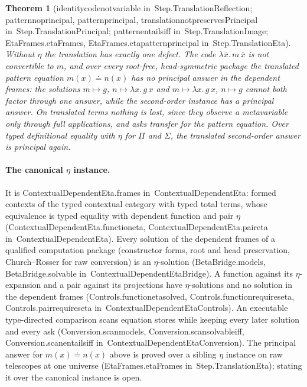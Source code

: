 \documentclass[11pt]{article}
\newtheorem{theorem}{Theorem}
\theoremstyle{remark}
\newcommand{\lean}[1]{{\ttfamily\def\_{\textunderscore\allowbreak}#1}}
\newcommand{\inmod}[1]{in~{\ttfamily\def\_{\textunderscore\allowbreak}#1}}
\begin{document}
\begin{theorem}[\lean{identity\_code\_not\_variable} \inmod{Step.TranslationReflection}; \lean{pattern\_no\_principal}, \lean{pattern\_principal}, \lean{translation\_not\_preservesPrincipal} \inmod{Step.TranslationPrincipal}; \lean{pattern\_entails\_iff} \inmod{Step.TranslationImage}; \lean{EtaFrames.etaFrames}, \lean{EtaFrames.eta\_pattern\_principal} \inmod{Step.TranslationEta}]
Without $\eta$ the translation has exactly one defect. The code $\lambda\bar x.\,m\,\bar x$ is not convertible
to $m$, and over every root-free, head-symmetric package the translated pattern equation $m(x)\doteq n(x)$
has no principal answer in the dependent frames: the solutions $m\mapsto g$, $n\mapsto\lambda x.\,g\,x$ and
$m\mapsto\lambda x.\,g\,x$, $n\mapsto g$ cannot both factor through one answer, while the second-order
instance has a principal answer. On translated terms nothing is lost, since they observe a
metavariable only through full applications, and asks transfer for the pattern equation. Over typed
definitional equality with $\eta$ for $\Pi$ and $\Sigma$, the translated second-order answer is principal
again.
\end{theorem}

\paragraph{The canonical $\eta$ instance.} It is \lean{ContextualDependentEta.frames}
\inmod{ContextualDependentEta}: formed contexts of the typed contextual category with typed total terms,
whose equivalence is typed equality with dependent function and pair $\eta$
(\lean{ContextualDependentEta.function\_eta}, \lean{ContextualDependentEta.pair\_eta} \inmod{ContextualDependentEta}). Every solution of
the dependent frames of a qualified computation package (constructor forms, root and head preservation,
Church--Rosser for raw conversion) is an $\eta$-solution (\lean{BetaBridge.models}, \lean{BetaBridge.solvable}
\inmod{ContextualDependentEtaBridge}). A function against its $\eta$-expansion and a pair against its
projections have $\eta$-solutions and no solution in the dependent frames
(\lean{Controls.function\_eta\_solved}, \lean{Controls.function\_requires\_eta}, \lean{Controls.pair\_requires\_eta}
\inmod{ContextualDependentEtaControls}). An executable type-directed comparison scans equation stores
while keeping every later solution and every ask (\lean{Conversion.scan\_models},
\lean{Conversion.scan\_solvable\_iff}, \lean{Conversion.scan\_entails\_iff} \inmod{ContextualDependentEtaConversion}).
The principal answer for $m(x)\doteq n(x)$ above is proved over a sibling $\eta$ instance on raw
telescopes at one universe (\lean{EtaFrames.etaFrames} \inmod{Step.TranslationEta}); stating it over the canonical instance is open.
\end{document}
